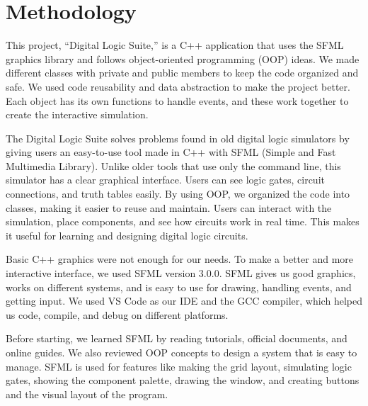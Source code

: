 \section{Methodology}

This project, “Digital Logic Suite,” is a C++ application that uses the SFML graphics library and follows object-oriented programming (OOP) ideas. We made different classes with private and public members to keep the code organized and safe. We used code reusability and data abstraction to make the project better. Each object has its own functions to handle events, and these work together to create the interactive simulation.

\vspace{0.5cm}
The Digital Logic Suite solves problems found in old digital logic simulators by giving users an easy-to-use tool made in C++ with SFML (Simple and Fast Multimedia Library). Unlike older tools that use only the command line, this simulator has a clear graphical interface. Users can see logic gates, circuit connections, and truth tables easily. By using OOP, we organized the code into classes, making it easier to reuse and maintain. Users can interact with the simulation, place components, and see how circuits work in real time. This makes it useful for learning and designing digital logic circuits.

\vspace{0.5cm}
Basic C++ graphics were not enough for our needs. To make a better and more interactive interface, we used SFML version 3.0.0. SFML gives us good graphics, works on different systems, and is easy to use for drawing, handling events, and getting input. We used VS Code as our IDE and the GCC compiler, which helped us code, compile, and debug on different platforms.

\vspace{0.5cm}
Before starting, we learned SFML by reading tutorials, official documents, and online guides. We also reviewed OOP concepts to design a system that is easy to manage. SFML is used for features like making the grid layout, simulating logic gates, showing the component palette, drawing the window, and creating buttons and the visual layout of the program.
\clearpage